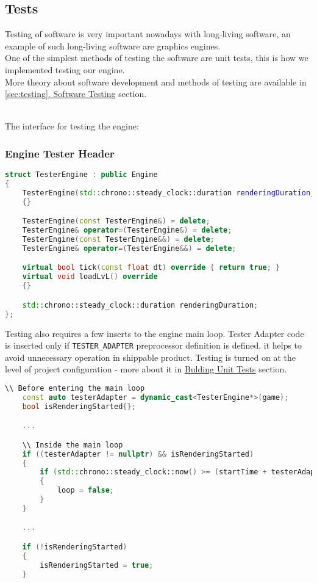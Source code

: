 \newpage
\subsection{Tests}
\label{sec:tests}
\hspace{\parindent}Testing of software is very important nowadays with long-living software, an example of such long-living software are graphics engines.\\
One of the simplest methods of testing the software are unit tests, this is how we implemented testing our engine.\\
More theory about software development and methods of testing are available in \hyperref[sec:testing]{\ref*{sec:testing}. Software Testing} section.

\noindent \\The interface for testing the engine:
\subsubsection{Engine Tester Header}
\label{sec:tester_adapter}
\begin{lstlisting}[language=c++, caption=Tester Engine class (./engine/tests/tester.cpp)]
struct TesterEngine : public Engine
{
    TesterEngine(std::chrono::steady_clock::duration renderingDuration_) : renderingDuration{renderingDuration_}
    {}

    TesterEngine(const TesterEngine&) = delete;
    TesterEngine& operator=(TesterEngine&) = delete;
    TesterEngine(const TesterEngine&&) = delete;
    TesterEngine& operator=(TesterEngine&&) = delete;

    virtual bool tick(const float dt) override { return true; }
    virtual void loadLvL() override
    {}

    std::chrono::steady_clock::duration renderingDuration;
};
\end{lstlisting}


Testing also requires a few inserts to the engine main loop. Tester Adapter code is inserted only if \texttt{TESTER\_ADAPTER} preprocessor definition is defined, it helps to avoid unnecessary operation in shippable product. Testing is turned on at the level of project configuration - more about it in \hyperref[sec:build_unit_tests]{Bulding Unit Tests} section. 
\begin{lstlisting}[language=c++, caption=Tester related code inside Engine Main Loop (./engine/src/core/core.cpp)]
    \\ Before entering the main loop
    const auto testerAdapter = dynamic_cast<TesterEngine*>(game);
    bool isRenderingStarted{};

    ...

    \\ Inside the main loop
    if ((testerAdapter != nullptr) && isRenderingStarted)
    {
        if (std::chrono::steady_clock::now() >= (startTime + testerAdapter->renderingDuration))
        {
            loop = false;
        }
    }

    ...

    if (!isRenderingStarted)
    {
        isRenderingStarted = true;
    }
\end{lstlisting}

